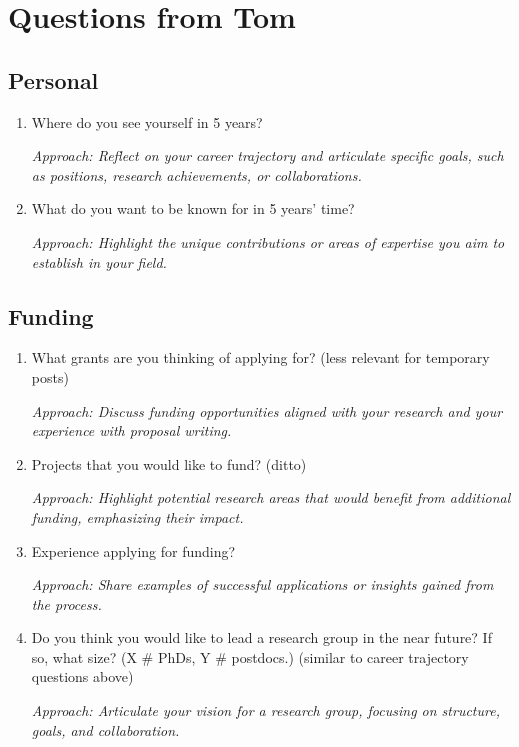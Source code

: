 \documentclass[12pt]{article}
\numberwithin{equation}{section}
\begin{document}
\section{Questions from Tom}

\subsection{Personal}
\begin{enumerate}
    \item Where do you see yourself in 5 years?
    
    \textit{Approach: Reflect on your career trajectory and articulate specific goals, such as positions, research achievements, or collaborations.}

    \item What do you want to be known for in 5 years' time?
    
    \textit{Approach: Highlight the unique contributions or areas of expertise you aim to establish in your field.}
\end{enumerate}



\subsection{Funding}
\begin{enumerate}
    \item What grants are you thinking of applying for? (less relevant for temporary posts)
    
    \textit{Approach: Discuss funding opportunities aligned with your research and your experience with proposal writing.}

    \item Projects that you would like to fund? (ditto)
    
    \textit{Approach: Highlight potential research areas that would benefit from additional funding, emphasizing their impact.}

    \item Experience applying for funding?
    
    \textit{Approach: Share examples of successful applications or insights gained from the process.}

    \item Do you think you would like to lead a research group in the near future? If so, what size? (X \# PhDs, Y \# postdocs.) (similar to career trajectory questions above)
    
    \textit{Approach: Articulate your vision for a research group, focusing on structure, goals, and collaboration.}
\end{enumerate}
\end{document}
